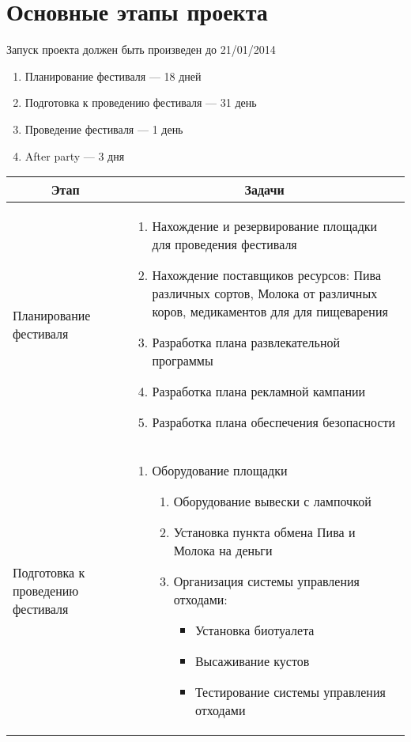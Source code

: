 \documentclass[a4paper,12pt]{article}
\begin{document}
\section{Основные этапы проекта}
Запуск проекта должен быть произведен до 21/01/2014
\begin{enumerate}
  \item{Планирование фестиваля --- 18 дней}
  \item{Подготовка к проведению фестиваля --- 31 день}
  \item{Проведение фестиваля --- 1 день}
  \item{After party --- 3 дня}
\end{enumerate}
\begin{center}
\begin{longtable}{|p{4cm}|p{11cm}|}
  \hline
  \multicolumn{1}{|c|}{\textbf{Этап}} & \multicolumn{1}{|c|}{\textbf{Задачи}}\\
  \hline
  \endhead
  Планирование фестиваля & 
  \begin{enumerate}
    \item Нахождение и резервирование площадки для проведения фестиваля
    \item Нахождение поставщиков ресурсов: Пива различных сортов, Молока от различных коров, медикаментов для для пищеварения 
    \item Разработка плана развлекательной программы 
    \item Разработка плана рекламной кампании
    \item Разработка плана обеспечения безопасности
  \end{enumerate} \\
  \hline
  Подготовка к проведению фестиваля & 
  \begin{enumerate}
    \item Оборудование площадки 
      \begin{enumerate}
        \item Оборудование вывески с лампочкой
        \item Установка пункта обмена Пива и Молока на деньги 
        \item Организация системы управления отходами:
          \begin{itemize}
            \item Установка биотуалета
            \item Высаживание кустов
            \item Тестирование системы управления отходами
          \end{itemize}

\end{enumerate}
\end{enumerate}
\end{longtable}
\end{center}
\end{document}

